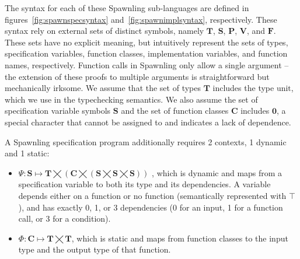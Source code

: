 The syntax for each of these Spawnling sub-languages are defined in figures~\ref{fig:spawnspecsyntax} and~\ref{fig:spawnimplsyntax}, respectively.  These syntax rely on external sets of distinct symbols, namely $\mathbf{T}$, $\textbf{S}$, $\textbf{P}$, $\mathbf{V}$, and $\mathbf{F}$.  These sets have no explicit meaning, but intuitively represent the sets of types, specification variables, function classes, implementation variables, and function names, respectively.  Function calls in Spawnling only allow a single argument -- the extension of these proofs to multiple arguments is straightforward but mechanically irksome.  We assume that the set of types $\mathbf{T}$ includes the type $\textrm{unit}$, which we use in the typechecking semantics.  We also assume the set of specification variable symbols $\mathbf{S}$ and the set of function classes $\mathbf{C}$ includes $\mathbf{0}$, a special character that cannot be assigned to and indicates a lack of dependence.

A Spawnling specification program additionally requires 2 contexts, 1 dynamic and 1 static:
\begin{itemize}
\item 
$\Psi:\mathbf{S}\mapsto
\mathbf{T}\bigtimes
\left(\mathbf{C}\bigtimes
\left(\mathbf{S}\bigtimes\mathbf{S}\bigtimes\mathbf{S}\right)
\right)$
, which is dynamic and maps from a specification variable to both its type and its dependencies.  A variable depends either on a function or no function (semantically represented with $\top$), and has exactly 0, 1, or 3 dependencies (0 for an input, 1 for a function call, or 3 for a condition).
\item $\Phi:\mathbf{C}\mapsto\mathbf{T}\bigtimes\mathbf{T}$, which is static and maps from function classes to the input type and the output type of that function.
\end{itemize}

